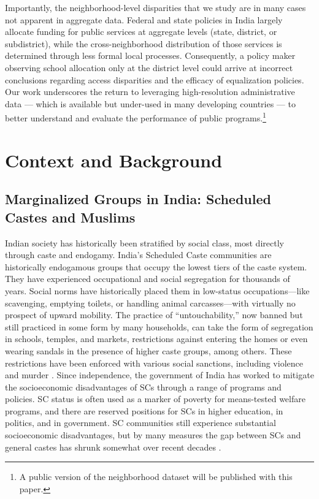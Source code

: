\documentclass[12pt]{article}
\begin{document}
Importantly, the neighborhood-level disparities that we study are in many cases not apparent in aggregate data. Federal and state policies in India largely allocate funding for public services at aggregate levels (state, district, or subdistrict), while the cross-neighborhood distribution of those services is determined through less formal local processes. Consequently, a policy maker observing school allocation only at the district level could arrive at incorrect conclusions regarding access disparities and the efficacy of equalization policies. Our work underscores the return to leveraging high-resolution administrative data --- which is available but under-used in many developing countries --- to better understand and evaluate the performance of public programs.\footnote{A public version of the neighborhood dataset will be published with this paper.}

\section{Context and Background}
\label{sec:bg}

\subsection{Marginalized Groups in India: Scheduled Castes and Muslims}

Indian society has historically been stratified by social class, most directly through caste and endogamy. India's Scheduled Caste communities are historically endogamous groups that occupy the lowest tiers of the caste system. They have experienced occupational and social segregation for thousands of years. Social norms have historically placed them in low-status occupations---like scavenging, emptying toilets, or handling animal carcasses---with virtually no prospect of upward mobility. The practice of ``untouchability,'' now banned but still practiced in some form by many households, can take the form of segregation in schools, temples, and markets, restrictions against entering the homes or even wearing sandals in the presence of higher caste groups, among others. These restrictions have been enforced with various social sanctions, including violence and murder \citep{girard2021stabbed}. Since independence, the government of India has worked to mitigate the socioeconomic disadvantages of SCs through a range of programs and policies. SC status is often used as a marker of poverty for means-tested welfare programs, and there are reserved positions for SCs in higher education, in politics, and in government. SC communities still experience substantial socioeconomic disadvantages, but by many measures the gap between SCs and general castes has shrunk somewhat over recent decades \citep{hnatkovska2012,emran2015,cassan2017,anr2022mob}.
\end{document}
